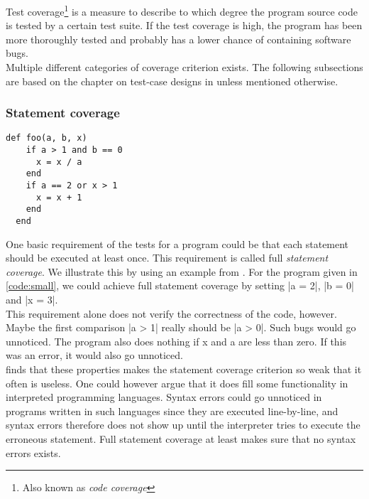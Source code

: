 \MakeShortVerb{\|}

Test coverage\footnote{Also known as \emph{code coverage}} is a measure
to describe to which degree the program source code is tested by a
certain test suite. If the test coverage is high, the program has been
more thoroughly tested and probably has a lower chance of containing
software bugs.\cite{wiki:coverage}\\

Multiple different categories of coverage criterion exists. The
following subsections are based on the chapter on test-case designs in
\citet{book:art_of_testing} unless mentioned otherwise.\\


\subsubsection{Statement coverage}

\begin{lstlisting}[caption=A small example program,
                   label=code:small, float=t]
  def foo(a, b, x)
    if a > 1 and b == 0
      x = x / a
    end
    if a == 2 or x > 1
      x = x + 1
    end
  end
\end{lstlisting}

One basic requirement of the tests for a program could be that each
statement should be executed at least once. This requirement is called
full \emph{statement coverage}. We illustrate this by using an example
from \citet{book:art_of_testing}. For the program given in
\ref{code:small}, we could achieve full statement coverage by setting
|a = 2|, |b = 0| and |x = 3|.\\

This requirement alone does not verify the correctness of the code,
however. Maybe the first comparison |a > 1| really should be |a > 0|.
Such bugs would go unnoticed. The program also does nothing if x and a
are less than zero. If this was an error, it would also go unnoticed.\\

\citeauthor{book:art_of_testing} finds that these properties makes the
statement coverage criterion so weak that it often is useless. One could
however argue that it does fill some functionality in interpreted
programming languages. Syntax errors could go unnoticed in programs
written in such languages since they are executed line-by-line, and
syntax errors therefore does not show up until the interpreter tries to
execute the erroneous statement. Full statement coverage at least makes
sure that no syntax errors exists.\\


